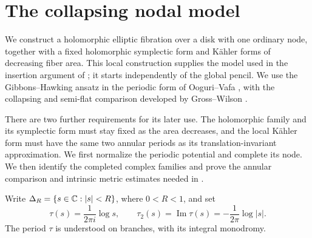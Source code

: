 \section{The collapsing nodal model}\label{sec:local-models}

We construct a holomorphic elliptic fibration over a disk with one
ordinary node, together with a fixed holomorphic symplectic form and
K\"ahler forms of decreasing fiber area.  This local construction
supplies the model used in the insertion argument of
; it starts independently of the global
pencil.  We use the Gibbons--Hawking ansatz
\cite{GibbonsHawking1978} in the periodic form of Ooguri--Vafa
\cite{OoguriVafa1996}, with the collapsing and semi-flat comparison
developed by Gross--Wilson \cite[Section~3]{GrossWilson2000}.

There are two further requirements for its later use.  The holomorphic
family and its symplectic form must stay fixed as the area decreases,
and the local K\"ahler form must have the same two annular periods as
its translation-invariant approximation.  We first normalize the
periodic potential and complete its node.  We then identify the
completed complex families and prove the annular comparison and
intrinsic metric estimates needed in .

Write \(\Delta_R=\{s\in\mathbb C:|s|<R\}\), where \(0<R<1\), and set
\begin{equation}\label{eq:nodal-period}
 \tau(s)=\frac{1}{2\pi i}\log s,\qquad
 \tau_2(s)=\operatorname{Im}\tau(s)=-\frac{1}{2\pi}\log|s|.
\end{equation}
The period \(\tau\) is understood on branches, with its integral monodromy.

